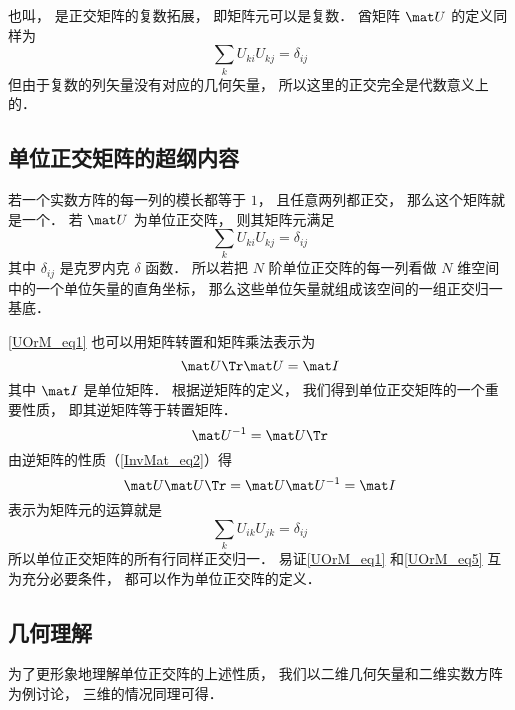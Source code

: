 

也叫， 是正交矩阵的复数拓展， 即矩阵元可以是复数． 酋矩阵 $\mat U$ 的定义同样为
\begin{equation}
\sum_k U_{ki} U_{kj} = \delta_{ij}
\end{equation}
但由于复数的列矢量没有对应的几何矢量， 所以这里的正交完全是代数意义上的．


\subsection{单位正交矩阵的超纲内容}


若一个实数方阵的每一列的模长都等于 $1$， 且任意两列都正交， 那么这个矩阵就是一个． 若 $\mat U$ 为单位正交阵， 则其矩阵元满足
\begin{equation}\label{UOrM_eq1}
\sum_k U_{ki} U_{kj} = \delta_{ij}
\end{equation}
其中 $\delta_{ij}$ 是克罗内克 $\delta$ 函数． 所以若把 $N$ 阶单位正交阵的每一列看做 $N$ 维空间中的一个单位矢量的直角坐标， 那么这些单位矢量就组成该空间的一组正交归一基底．

\autoref{UOrM_eq1} 也可以用矩阵转置和矩阵乘法表示为
\begin{equation}
\mat U\Tr \mat U = \mat I
\end{equation}
其中 $\mat I$ 是单位矩阵． 根据逆矩阵的定义， 我们得到单位正交矩阵的一个重要性质， 即其逆矩阵等于转置矩阵．
\begin{equation}
\mat U^{-1} = \mat U\Tr
\end{equation}
由逆矩阵的性质（\autoref{InvMat_eq2}）得
\begin{equation}
\mat U \mat U\Tr = \mat U \mat U^{-1} = \mat I
\end{equation}
表示为矩阵元的运算就是
\begin{equation}\label{UOrM_eq5}
\sum_k U_{ik} U_{jk} = \delta_{ij}
\end{equation}
所以单位正交矩阵的所有行同样正交归一． 易证\autoref{UOrM_eq1} 和\autoref{UOrM_eq5} 互为充分必要条件， 都可以作为单位正交阵的定义．

\subsection{几何理解}
为了更形象地理解单位正交阵的上述性质， 我们以二维几何矢量和二维实数方阵为例讨论， 三维的情况同理可得．

